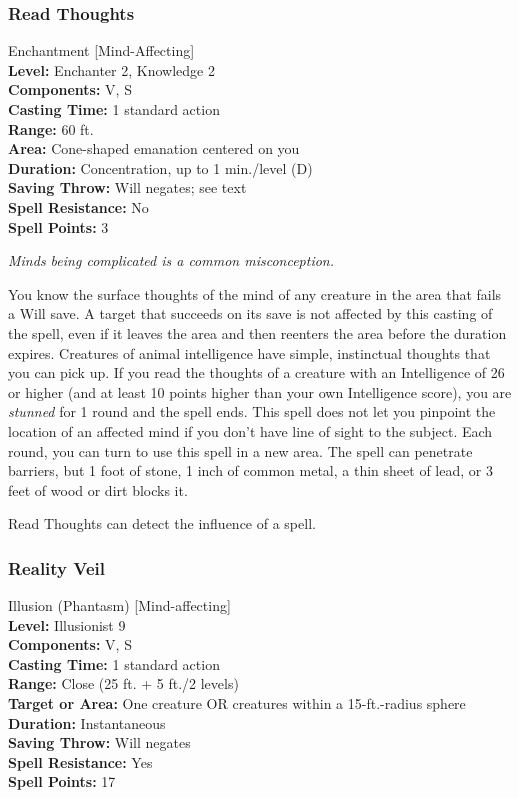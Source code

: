 \subsubsection{Read Thoughts}
\label{Spell:ReadThoughts}
Enchantment [Mind-Affecting]
\\ \textbf{Level:} Enchanter 2, Knowledge 2
\\ \textbf{Components:} V, S
\\ \textbf{Casting Time:} 1 standard action
\\ \textbf{Range:} 60 ft.
\\ \textbf{Area:} Cone-shaped emanation centered on you
\\ \textbf{Duration:} Concentration, up to 1 min./level (D)
\\ \textbf{Saving Throw:} Will negates; see text
\\ \textbf{Spell Resistance:} No
\\ \textbf{Spell Points:} 3

\emph{Minds being complicated is a common misconception.}

You know the surface thoughts of the mind of any creature in the area that fails a Will save. 
A target that succeeds on its save is not affected by this casting of the spell,
even if it leaves the area and then reenters the area before the duration expires.
Creatures of animal intelligence have simple, instinctual thoughts that you can pick up. 
If you read the thoughts of a creature with an Intelligence of 26 or higher (and at least 10 points higher than your own Intelligence score), 
you are \emph{stunned} for 1 round and the spell ends. 
This spell does not let you pinpoint the location of an affected mind if you don't have line of sight to the subject.
Each round, you can turn to use this spell in a new area. 
The spell can penetrate barriers, but 1 foot of stone, 1 inch of common metal, a thin sheet of lead, or 3 feet of wood or dirt blocks it.

Read Thoughts can detect the influence of a  spell.
\subsubsection{Reality Veil}
\label{Spell:RealityVeil}
Illusion (Phantasm) [Mind-affecting]
\\ \textbf{Level:} Illusionist 9
\\ \textbf{Components:} V, S
\\ \textbf{Casting Time:} 1 standard action
\\ \textbf{Range:} Close (25 ft. + 5 ft./2 levels)
\\ \textbf{Target or Area:} One creature OR creatures within a 15-ft.-radius sphere
\\ \textbf{Duration:} Instantaneous
\\ \textbf{Saving Throw:} Will negates
\\ \textbf{Spell Resistance:} Yes
\\ \textbf{Spell Points:} 17

